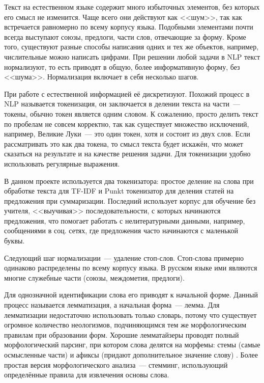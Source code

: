 \documentclass[a4paper, 14pt]{extarticle}
\begin{document}
Текст на естественном языке содержит много избыточных элементов, без которых его смысл не изменится. Чаще всего они действуют как <<шум>>, так как встречается равномерно по всему корпусу языка. Подобными элементами почти всегда выступают союзы, предлоги, части слов, отвечающие за форму. Кроме того, существуют разные способы написания одних и тех же объектов, например, числительные можно написать цифрами. При решении любой задачи в NLP текст нормализуют, то есть приводят в общую, более информативную форму, без <<шума>>. Нормализация включает в себя несколько шагов.

При работе с естественной информацией её дискретизуют. Похожий процесс в NLP называется токенизация, он заключается в делении текста на части~--- токены, обычно токен является одним словом. К сожалению, просто делить текст по пробелам не совсем корректно, так как существует множество исключений, например, Великие Луки~--- это один токен, хотя и состоит из двух слов. Если рассматривать это как два токена, то смысл текста будет искажён, что может сказаться на результате и на качестве решения задачи. Для токенизации удобно использовать регулярные выражения.

В данном проекте используется два токенизатора: простое деление на слова при обработке текста для TF-IDF и Punkt токенизатор для деления статей на предложения при суммаризации. Последний использует корпус для обучение без учителя, <<выучивая>> последовательности, с которых начинаются предложения, что помогает работать с нелитературными данными, например, сообщениями в соц. сетях, где предложения часто начинаются с маленькой буквы.

Следующий шаг нормализации~--- удаление стоп-слов. Стоп-слова примерно одинаково распределены по всему корпусу языка. В русском языке ими являются многие служебные части (союзы, междометия, предлоги).

Для однозначной идентификации слова его приводят к начальной форме. Данный процесс называется лемматизация, а начальная форма~--- лемма. Для лемматизации недостаточно использовать только словарь, потому что существует огромное количество неологизмов, подчиняющимся тем же морфологическим правилам при образовании форм. Хорошие лемматайзеры проводят полный морфологический парсинг, при котором слова делятся на морфемы: стемы (самые осмысленные части) и афиксы (придают дополнительное значение слову) \cite{c2}. Более простая версия морфологического анализа~--- стемминг, использующий определённые правила для извлечения основы слова.%
\end{document}
